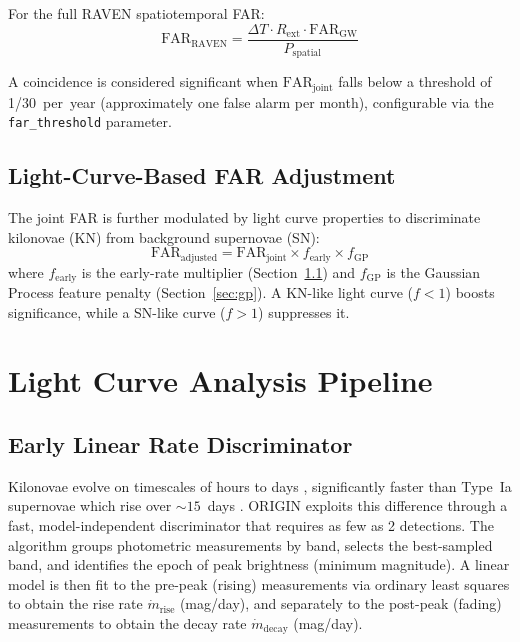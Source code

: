 \documentclass[twocolumn]{article}
\begin{document}
For the full RAVEN spatiotemporal FAR:
\begin{equation} \label{eq:farraven}
    \mathrm{FAR}_\mathrm{RAVEN} = \frac{\Delta T \cdot R_\mathrm{ext} \cdot \mathrm{FAR}_\mathrm{GW}}{P_\mathrm{spatial}}
\end{equation}

A coincidence is considered significant when $\mathrm{FAR}_\mathrm{joint}$ falls below a threshold of 1/30~per~year (approximately one false alarm per month), configurable via the \texttt{far\_threshold} parameter.

\subsection{Light-Curve-Based FAR Adjustment} \label{sec:lcfar}

The joint FAR is further modulated by light curve properties to discriminate kilonovae (KN) from background supernovae (SN):
\begin{equation} \label{eq:faradj}
    \mathrm{FAR}_\mathrm{adjusted} = \mathrm{FAR}_\mathrm{joint} \times f_\mathrm{early} \times f_\mathrm{GP}
\end{equation}
where $f_\mathrm{early}$ is the early-rate multiplier (Section~\ref{sec:earlyrate}) and $f_\mathrm{GP}$ is the Gaussian Process feature penalty (Section~\ref{sec:gp}). A KN-like light curve ($f < 1$) boosts significance, while a SN-like curve ($f > 1$) suppresses it.

\section{Light Curve Analysis Pipeline} \label{sec:lightcurve}

\subsection{Early Linear Rate Discriminator} \label{sec:earlyrate}

Kilonovae evolve on timescales of hours to days \citep{Metzger2017, Kasen2017}, significantly faster than Type~Ia supernovae which rise over ${\sim}15$~days \citep{Arnett1982}. ORIGIN exploits this difference through a fast, model-independent discriminator that requires as few as 2 detections. The algorithm groups photometric measurements by band, selects the best-sampled band, and identifies the epoch of peak brightness (minimum magnitude). A linear model is then fit to the pre-peak (rising) measurements via ordinary least squares to obtain the rise rate $\dot{m}_\mathrm{rise}$ (mag/day), and separately to the post-peak (fading) measurements to obtain the decay rate $\dot{m}_\mathrm{decay}$ (mag/day).
\end{document}
